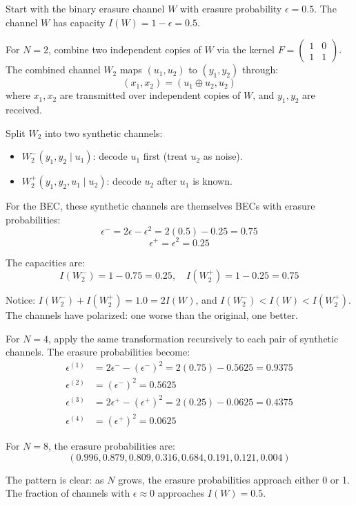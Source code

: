\begin{example}[Channel Polarization for $N=2$: Detailed Example]
Start with the binary erasure channel $W$ with erasure probability $\epsilon = 0.5$. The channel $W$ has capacity $I(W) = 1 - \epsilon = 0.5$.

For $N = 2$, combine two independent copies of $W$ via the kernel $F = \begin{pmatrix}1 & 0\\ 1 & 1\end{pmatrix}$. The combined channel $W_2$ maps $(u_1, u_2)$ to $(y_1, y_2)$ through:
\[
(x_1, x_2) = (u_1 \oplus u_2, u_2)
\]
where $x_1, x_2$ are transmitted over independent copies of $W$, and $y_1, y_2$ are received.

Split $W_2$ into two synthetic channels:
\begin{itemize}
\item $W_2^{-}(y_1,y_2 \mid u_1)$: decode $u_1$ first (treat $u_2$ as noise).
\item $W_2^{+}(y_1,y_2,u_1 \mid u_2)$: decode $u_2$ after $u_1$ is known.
\end{itemize}

For the BEC, these synthetic channels are themselves BECs with erasure probabilities:
\[
\epsilon^{-} = 2\epsilon - \epsilon^2 = 2(0.5) - 0.25 = 0.75
\]
\[
\epsilon^{+} = \epsilon^2 = 0.25
\]

The capacities are:
\[
I(W_2^{-}) = 1 - 0.75 = 0.25,\quad
I(W_2^{+}) = 1 - 0.25 = 0.75
\]

Notice: $I(W_2^{-}) + I(W_2^{+}) = 1.0 = 2I(W)$, and $I(W_2^{-}) < I(W) < I(W_2^{+})$. The channels have polarized: one worse than the original, one better.

For $N = 4$, apply the same transformation recursively to each pair of synthetic channels. The erasure probabilities become:
\[
\begin{aligned}
\epsilon^{(1)} &= 2\epsilon^{-} - (\epsilon^{-})^2 = 2(0.75) - 0.5625 = 0.9375 \\
\epsilon^{(2)} &= (\epsilon^{-})^2 = 0.5625 \\
\epsilon^{(3)} &= 2\epsilon^{+} - (\epsilon^{+})^2 = 2(0.25) - 0.0625 = 0.4375 \\
\epsilon^{(4)} &= (\epsilon^{+})^2 = 0.0625
\end{aligned}
\]

For $N = 8$, the erasure probabilities are:
\[
(0.996, 0.879, 0.809, 0.316, 0.684, 0.191, 0.121, 0.004)
\]

The pattern is clear: as $N$ grows, the erasure probabilities approach either 0 or 1. The fraction of channels with $\epsilon \approx 0$ approaches $I(W) = 0.5$.


\end{example}
